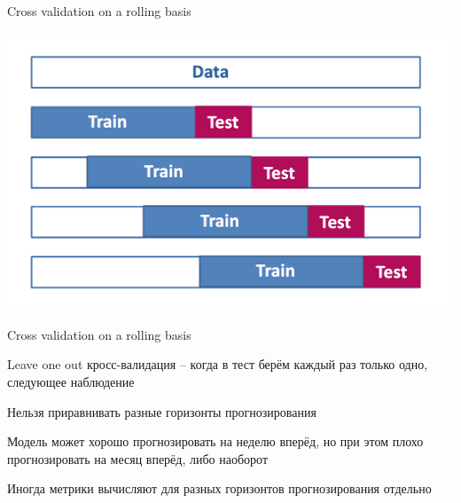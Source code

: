 \documentclass[notes,12pt, aspectratio=169]{beamer}
\newenvironment{wideitemize}{\itemize\addtolength{\itemsep}{10pt}}{\enditemize}
\begin{document}
\begin{frame}{Cross validation on a rolling basis}
\begin{center}
	\includegraphics[width=.7\linewidth]{cv2.png}
\end{center}
\end{frame}


\begin{frame}{Cross validation on a rolling basis}
\begin{wideitemize}
	\item  \alert{Leave one out кросс-валидация} – когда в тест берём каждый раз только одно, следующее наблюдение

	
	\item Нельзя приравнивать разные горизонты прогнозирования 

	
	\item Модель может хорошо прогнозировать на неделю вперёд, но при этом плохо прогнозировать на месяц вперёд, либо наоборот 
	
	\item Иногда метрики вычисляют для разных горизонтов прогнозирования отдельно
\end{wideitemize}
\end{frame}
\end{document}
